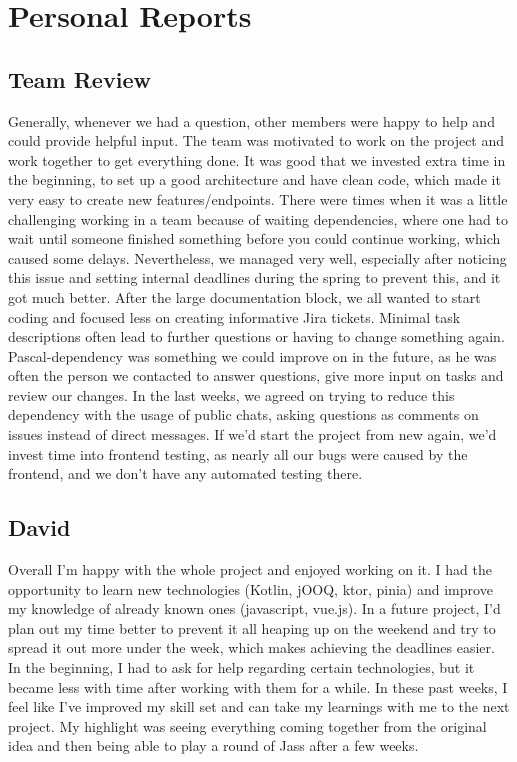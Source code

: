 \chapter{Personal Reports}

\section{Team Review}
Generally, whenever we had a question, other members were happy to help and could provide helpful input.
The team was motivated to work on the project and work together to get everything done.
It was good that we invested extra time in the beginning, to set up a good architecture and have clean code, which made it very easy to create new features/endpoints.
There were times when it was a little challenging working in a team because of waiting dependencies, where one had to wait until someone finished something before you could continue working, which caused some delays.
Nevertheless, we managed very well, especially after noticing this issue and setting internal deadlines during the spring to prevent this, and it got much better.
After the large documentation block, we all wanted to start coding and focused less on creating informative Jira tickets. Minimal task descriptions often lead to further questions or having to change something again.
Pascal-dependency was something we could improve on in the future, as he was often the person we contacted to answer questions, give more input on tasks and review our changes.
In the last weeks, we agreed on trying to reduce this dependency with the usage of public chats, asking questions as comments on issues instead of direct messages.
If we'd start the project from new again, we'd invest time into frontend testing, as nearly all our bugs were caused by the frontend, and we don't have any automated testing there.

\section{David}
Overall I'm happy with the whole project and enjoyed working on it.
I had the opportunity to learn new technologies (Kotlin, jOOQ, ktor, pinia) and improve my knowledge of already known ones (javascript, vue.js).
In a future project, I'd plan out my time better to prevent it all heaping up on the weekend and try to spread it out more under the week, which makes achieving the deadlines easier.
In the beginning, I had to ask for help regarding certain technologies, but it became less with time after working with them for a while.
In these past weeks, I feel like I've improved my skill set and can take my learnings with me to the next project.
My highlight was seeing everything coming together from the original idea and then being able to play a round of Jass after a few weeks.

